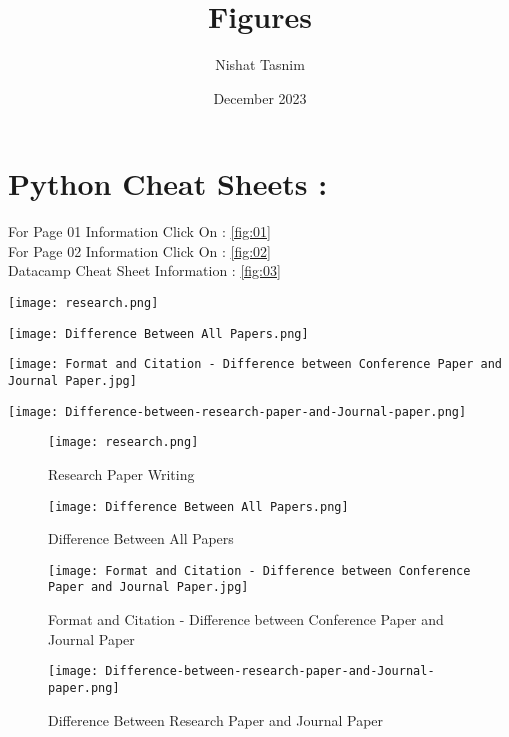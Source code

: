 \documentclass{article}
\title{Figures}
\author{Nishat Tasnim}
\date{December 2023}
\begin{document}
\maketitle
\section{Python Cheat Sheets :}
For Page 01 Information Click On : \ref{fig:01}\\
For Page 02 Information Click On : \ref{fig:02}\\
Datacamp Cheat Sheet Information : \ref{fig:03}

\listoffigures


\newpage
\begin{center}
    \texttt{[image: research.png]}
\end{center}

\begin{center}
    \texttt{[image: Difference Between All Papers.png]}
\end{center}

\begin{center}
    \texttt{[image: Format and Citation - Difference between Conference Paper and Journal Paper.jpg]}
\end{center}

\begin{center}
    \texttt{[image: Difference-between-research-paper-and-Journal-paper.png]}
\end{center}

\newpage
\begin{figure}[h]
    \centering
    \texttt{[image: research.png]}
    \caption{Research Paper Writing}
\end{figure}

\begin{figure}[h]
    \centering
    \texttt{[image: Difference Between All Papers.png]}
    \caption{Difference Between All Papers}
\end{figure}

\begin{figure}[h]
    \centering
    \texttt{[image: Format and Citation - Difference between Conference Paper and Journal Paper.jpg]}
    \caption{Format and Citation - Difference between Conference Paper and Journal Paper}
\end{figure}

\begin{figure}[h]
    \centering
    \texttt{[image: Difference-between-research-paper-and-Journal-paper.png]}
    \caption{Difference Between Research Paper and Journal Paper}
\end{figure}
\end{document}
